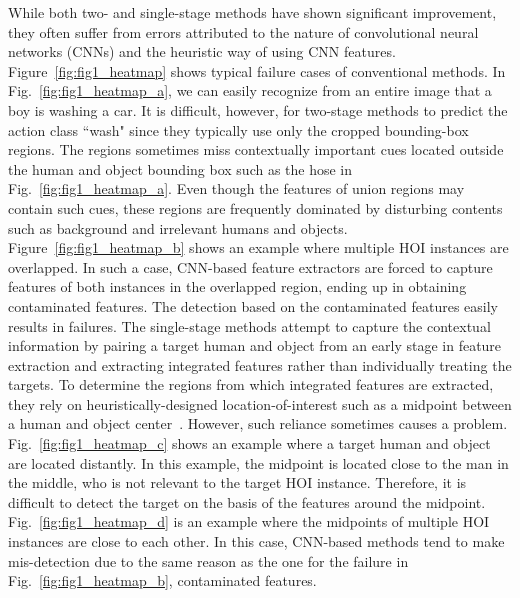 \documentclass[final]{cvpr}
\begin{document}
While both two- and single-stage methods have shown significant improvement, 
they often suffer from errors attributed to the nature of convolutional neural networks (CNNs) and the heuristic way of using CNN features.
Figure~\ref{fig:fig1_heatmap} shows typical failure cases of conventional methods. 
In Fig.~\ref{fig:fig1_heatmap_a}, we can easily recognize from an entire image that a boy is washing a car.
It is difficult, however, for two-stage methods to predict the action class ``wash" since they typically use only the cropped bounding-box regions.
The regions sometimes miss contextually important cues located outside the human and object bounding box such as the hose in Fig.~\ref{fig:fig1_heatmap_a}.
Even though the features of union regions may contain such cues, these regions are frequently dominated by disturbing contents such as background and irrelevant humans and objects.
Figure~\ref{fig:fig1_heatmap_b} shows an example where multiple HOI instances are overlapped.
In such a case, CNN-based feature extractors are forced to capture features of both instances in the overlapped region, ending up in obtaining contaminated features.
The detection based on the contaminated features easily results in failures.
The single-stage methods attempt to capture the contextual information by pairing a target human and object from an early stage in feature extraction and extracting integrated features rather than individually treating the targets. 
To determine the regions from which integrated features are extracted, they rely on heuristically-designed location-of-interest such as a midpoint between a human and object center~\cite{liao_cvpr2020}.
However, such reliance sometimes causes a problem.
Fig.~\ref{fig:fig1_heatmap_c} shows an example where a target human and object are located distantly.
In this example, the midpoint is located close to the man in the middle, who is not relevant to the target HOI instance.
Therefore, it is difficult to detect the target on the basis of the features around the midpoint.
Fig.~\ref{fig:fig1_heatmap_d} is an example where the midpoints of multiple HOI instances are close to each other.
In this case, CNN-based methods tend to make mis-detection due to the same reason as the one for the failure in Fig.~\ref{fig:fig1_heatmap_b}, \ie contaminated features.
\end{document}
